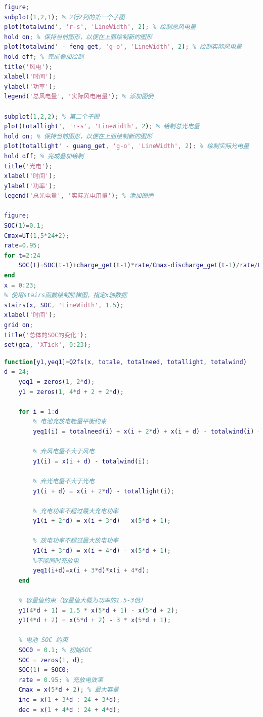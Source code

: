 \documentclass{cumcmthesis}
\begin{document}
\begin{appendices}
\begin{lstlisting}[language=Matlab]
figure;
subplot(1,2,1); % 2行2列的第一个子图
plot(totalwind', 'r-s', 'LineWidth', 2); % 绘制总风电量
hold on; % 保持当前图形，以便在上面绘制新的图形
plot(totalwind' - feng_get, 'g-o', 'LineWidth', 2); % 绘制实际风电量
hold off; % 完成叠加绘制
title('风电');
xlabel('时间');
ylabel('功率');
legend('总风电量', '实际风电用量'); % 添加图例

subplot(1,2,2); % 第二个子图
plot(totallight', 'r-s', 'LineWidth', 2); % 绘制总光电量
hold on; % 保持当前图形，以便在上面绘制新的图形
plot(totallight' - guang_get, 'g-o', 'LineWidth', 2); % 绘制实际光电量
hold off; % 完成叠加绘制
title('光电');
xlabel('时间');
ylabel('功率');
legend('总光电量', '实际光电用量'); % 添加图例

figure;
SOC(1)=0.1;
Cmax=UT(1,5*24+2);
rate=0.95;
for t=2:24
    SOC(t)=SOC(t-1)+charge_get(t-1)*rate/Cmax-discharge_get(t-1)/rate/Cmax;
end
x = 0:23;
% 使用stairs函数绘制阶梯图，指定x轴数据
stairs(x, SOC, 'LineWidth', 1.5);
xlabel('时间');
grid on;
title('总体的SOC的变化');
set(gca, 'XTick', 0:23); 
\end{lstlisting}


	
\begin{lstlisting}[language=Matlab]
function[y1,yeq1]=Q2fs(x, totale, totalneed, totallight, totalwind)
d = 24;
    yeq1 = zeros(1, 2*d);
    y1 = zeros(1, 4*d + 2 + 2*d);
    
    for i = 1:d
        % 电池充放电能量平衡约束
        yeq1(i) = totalneed(i) + x(i + 2*d) + x(i + d) - totalwind(i) - totallight(i) + x(i + 3*d) - x(i) - x(i + 4*d);
        
        % 弃风电量不大于风电
        y1(i) = x(i + d) - totalwind(i);
        
        % 弃光电量不大于光电
        y1(i + d) = x(i + 2*d) - totallight(i);
        
        % 充电功率不超过最大充电功率
        y1(i + 2*d) = x(i + 3*d) - x(5*d + 1);
        
        % 放电功率不超过最大放电功率
        y1(i + 3*d) = x(i + 4*d) - x(5*d + 1);
        %不能同时充放电
        yeq1(i+d)=x(i + 3*d)*x(i + 4*d);
    end
    
    % 容量值约束（容量值大概为功率的1.5-3倍）
    y1(4*d + 1) = 1.5 * x(5*d + 1) - x(5*d + 2);
    y1(4*d + 2) = x(5*d + 2) - 3 * x(5*d + 1);
    
    % 电池 SOC 约束
    SOC0 = 0.1; % 初始SOC
    SOC = zeros(1, d);
    SOC(1) = SOC0;
    rate = 0.95; % 充放电效率
    Cmax = x(5*d + 2); % 最大容量
    inc = x(1 + 3*d : 24 + 3*d);
    dec = x(1 + 4*d : 24 + 4*d);
    

\end{lstlisting}
\end{appendices}
\end{document}
